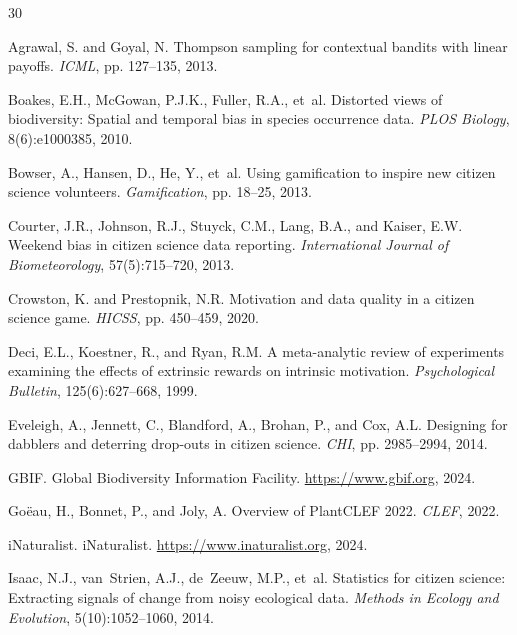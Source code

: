 \begin{thebibliography}{30}

Agrawal, S. and Goyal, N.
\newblock Thompson sampling for contextual bandits with linear payoffs.
\newblock \emph{ICML}, pp. 127--135, 2013.

Boakes, E.H., McGowan, P.J.K., Fuller, R.A., et~al.
\newblock Distorted views of biodiversity: Spatial and temporal bias in species
  occurrence data.
\newblock \emph{PLOS Biology}, 8(6):e1000385, 2010.

Bowser, A., Hansen, D., He, Y., et~al.
\newblock Using gamification to inspire new citizen science volunteers.
\newblock \emph{Gamification}, pp. 18--25, 2013.

Courter, J.R., Johnson, R.J., Stuyck, C.M., Lang, B.A., and Kaiser, E.W.
\newblock Weekend bias in citizen science data reporting.
\newblock \emph{International Journal of Biometeorology}, 57(5):715--720, 2013.

Crowston, K. and Prestopnik, N.R.
\newblock Motivation and data quality in a citizen science game.
\newblock \emph{HICSS}, pp. 450--459, 2020.

Deci, E.L., Koestner, R., and Ryan, R.M.
\newblock A meta-analytic review of experiments examining the effects of
  extrinsic rewards on intrinsic motivation.
\newblock \emph{Psychological Bulletin}, 125(6):627--668, 1999.

Eveleigh, A., Jennett, C., Blandford, A., Brohan, P., and Cox, A.L.
\newblock Designing for dabblers and deterring drop-outs in citizen science.
\newblock \emph{CHI}, pp. 2985--2994, 2014.

GBIF.
\newblock Global Biodiversity Information Facility.
\newblock \url{https://www.gbif.org}, 2024.

Go{\"e}au, H., Bonnet, P., and Joly, A.
\newblock Overview of PlantCLEF 2022.
\newblock \emph{CLEF}, 2022.

iNaturalist.
\newblock iNaturalist.
\newblock \url{https://www.inaturalist.org}, 2024.

Isaac, N.J., van~Strien, A.J., de~Zeeuw, M.P., et~al.
\newblock Statistics for citizen science: Extracting signals of change from
  noisy ecological data.
\newblock \emph{Methods in Ecology and Evolution}, 5(10):1052--1060, 2014.


\end{thebibliography}
